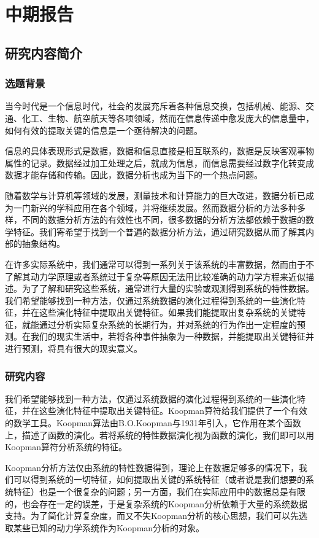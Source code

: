 \chapter{中期报告}
\section{研究内容简介}
\subsection{选题背景}
当今时代是一个信息时代，社会的发展充斥着各种信息交换，包括机械、能源、交通、化工、生物、航空航天等各项领域，然而在信息传递中愈发庞大的信息量中，如何有效的提取关键的信息是一个亟待解决的问题。

信息的具体表现形式是数据，数据和信息直接是相互联系的，数据是反映客观事物属性的记录。数据经过加工处理之后，就成为信息，而信息需要经过数字化转变成数据才能存储和传输。因此，数据分析也成为当下的一个热点问题。

随着数学与计算机等领域的发展，测量技术和计算能力的巨大改进，数据分析已成为一门新兴的学科应用在各个领域，并将继续发展。然而数据分析的方法多种多样，不同的数据分析方法的有效性也不同，很多数据的分析方法都依赖于数据的数学特征。我们寄希望于找到一个普遍的数据分析方法，通过研究数据从而了解其内部的抽象结构。

在许多实际系统中，我们通常可以得到一系列关于该系统的丰富数据，然而由于不了解其动力学原理或者系统过于复杂等原因无法用比较准确的动力学方程来近似描述。为了了解和研究这些系统，通常进行大量的实验或观测得到系统的特性数据。我们希望能够找到一种方法，仅通过系统数据的演化过程得到系统的一些演化特征，并在这些演化特征中提取出关键特征。如果我们能提取出复杂系统的关键特征，就能通过分析实际复杂系统的长期行为，并对系统的行为作出一定程度的预测。在我们的现实生活中，若将各种事件抽象为一种数据，并能提取出关键特征并进行预测，将具有很大的现实意义。

\subsection{研究内容}
我们希望能够找到一种方法，仅通过系统数据的演化过程得到系统的一些演化特征，并在这些演化特征中提取出关键特征。Koopman算符给我们提供了一个有效的数学工具。Koopman算法由B.O.Koopman与1931年引入，它作用在某个函数上，描述了函数的演化。若将系统的特性数据演化视为函数的演化，我们即可以用Koopman算符分析系统的特征。

Koopman分析方法仅由系统的特性数据得到，理论上在数据足够多的情况下，我们可以得到系统的一切特征，如何提取出关键的系统特征（或者说是我们想要的系统特征）也是一个很复杂的问题；另一方面，我们在实际应用中的数据总是有限的，也会存在一定的误差，于是复杂系统的Koopman分析依赖于大量的系统数据支持。为了简化计算复杂度，而又不失Koopman分析的核心思想，我们可以先选取某些已知的动力学系统作为Koopman分析的对象。

